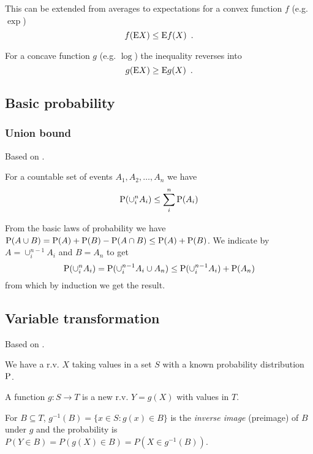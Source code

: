 This can be extended from averages to expectations for a convex function $f$ (e.g. $\exp$)
\begin{equation}\label{eq:Jensens}
f(\mathrm{E}{X}) \leq \mathrm{E}{f(X)} \enspace .
\end{equation}

For a concave function $g$ (e.g. $\log$) the inequality reverses into
\begin{equation}
g(\mathrm{E}{X}) \geq \mathrm{E}{g(X)} \enspace .
\end{equation}


\subsection{Basic probability}\label{sec:BasicProb}

\subsubsection{Union bound}

Based on \cite{Casella2002}.

For a countable set of events $A_1, A_2, \ldots, A_n$ we have
\begin{equation}
\mathrm{P} (\cup_i^n A_i) \leq \sum_i^n \mathrm{P} (A_i)
\end{equation}

\begin{prf}
From the basic laws of probability we have $\mathrm{P}(A \cup B) = \mathrm{P}(A) + \mathrm{P}(B) - \mathrm{P}(A \cap B) \leq \mathrm{P}(A) + \mathrm{P}(B)$.
We indicate by $A = \cup_i^{n-1} A_i$ and $B = A_n$ to get
\begin{equation}
\mathrm{P} (\cup_i^n A_i) = \mathrm{P}(\cup_i^{n-1} A_i \cup A_n) \leq \mathrm{P}(\cup_i^{n-1} A_i) + \mathrm{P}(A_n)
\end{equation}
from which by induction we get the result.
\end{prf}

\subsection{Variable transformation}\label{sec:VarTransform}

Based on \cite{random}.

We have a r.v. $X$ taking values in a set $S$ with a known probability distribution $\mathrm{P}$.

A function $g: S \to T$ is a new r.v. $Y = g(X)$ with values in $T$.

For $B \subseteq T$, $g^{-1}(B) = \{x \in S: g(x) \in B\}$ is the \emph{inverse image} (preimage) of $B$ under $g$ and the probability is $P(Y \in B) = P(g(X) \in B) = P(X \in g^{-1}(B))$. 

